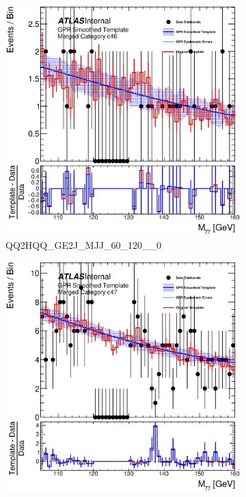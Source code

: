 \begin{figure}
\begin{center}
\begin{subfigure}[T]{0.49\linewidth}
	\centering
	\includegraphics[width=\linewidth]{figures/background/gpr/coupCatTemplates/GPR_Smoothed_Plot_hmgg_c46.eps}
	\caption{QQ2HQQ\_GE2J\_MJJ\_60\_120\_\_0}
\end{subfigure}
\begin{subfigure}[T]{0.49\linewidth}
	\centering
	\includegraphics[width=\linewidth]{figures/background/gpr/coupCatTemplates/GPR_Smoothed_Plot_hmgg_c47.eps}

\end{subfigure}
\end{center}
\end{figure}
